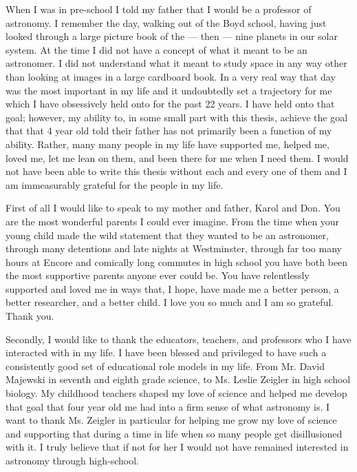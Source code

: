 When I was in pre-school I told my father that I would be a professor of
astronomy. I remember the day, walking out of the Boyd school, having just
looked through a large picture book of the --- then --- nine planets in our
solar system. At the time I did not have a concept of what it meant to be an
astronomer. I did not understand what it meant to study space in any way other
than looking at images in a large cardboard book. In a very real way that day
was the most important in my life and it undoubtedly set a trajectory for me
which I have obsessively held onto for the past 22 years. I have held onto
that goal; however, my ability to, in some small part with this thesis, achieve
the goal that that 4 year old told their father has not primarily been a
function of my ability. Rather, many many people in my life have supported me,
helped me, loved me, let me lean on them, and been there for me when I need
them. I would not have been able to write this thesis without each and every
one of them and I am immeasurably grateful for the people in my life.

First of all I would like to speak to my mother and father, Karol and Don. You
are the most wonderful parents I could ever imagine. From the time when your
young child made the wild statement that they wanted to be an astronomer,
through many detentions and late nights at Westminster, through far too many
hours at Encore and comically long commutes in high school you have both been
the most supportive parents anyone ever could be. You have relentlessly
supported and loved me in ways that, I hope, have made me a better person, 
a better researcher, and a better child. I love you so much and I am so
grateful. Thank you.

Secondly, I would like to thank the educators, teachers, and professors who
I have interacted with in my life. I have been blessed and privileged to
have such a consistently good set of educational role models in my life. From
Mr. David Majewski in seventh and eighth grade science, to Ms. Leslie Zeigler 
in high school biology. My childhood teachers shaped my love of science and
helped me develop that goal that four year old me had into a firm sense of
what astronomy is. I want to thank Ms. Zeigler in particular for helping me 
grow my love of science and supporting that during a time in life when so 
many people get disillusioned with it. I truly believe that if not for her
I would not have remained interested in astronomy through high-school.

